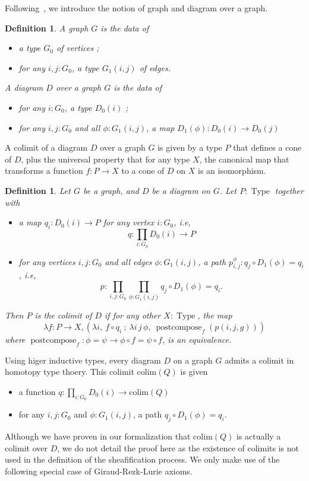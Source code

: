 \documentclass[conference]{IEEEtran}
\newtheorem{defi}[thm]{Definition}
\newcommand{\ie}{i.e,\xspace}
\DeclareMathOperator{\Type}{Type}
\DeclareMathOperator{\postcompose}{\mathrm{postcompose}}
\newcommand \colim[1] {\mathrm{colim}(Q)}
\begin{document}
Following~\cite{lumsdaine}, we introduce the notion of graph and
diagram over a graph.
%
\begin{defi}
  A {\em graph} $G$ is the data of
  \begin{itemize}
  \item a type $G_0$ of vertices ;
  \item for any $i,j:G_0$, a type $G_1(i,j)$ of edges.
  \end{itemize}

  A {\em diagram} $D$ over a graph $G$ is the data of
  \begin{itemize}
  \item for any $i:G_0$, a type $D_0(i)$ ;
  \item for any $i,j:G_0$ and all $\phi : G_1(i,j)$, a map $D_1(\phi)
    : D_0(i) \to D_0(j)$
  \end{itemize}
\end{defi}

A colimit of a diagram $D$ over a graph $G$ is given by a type $P$
that defines a cone of $D$, plus the universal property that for any
type $X$, the canonical map that transforms a function $f : P
\rightarrow X$ to a cone of $D$ on $X$ is an isomorphism.
% 
\begin{defi}
Let $G$ be a graph, and $D$ be a diagram on $G$. 
Let $P:\Type$ together with
\begin{itemize}
\item a map $q_i : D_0(i) \to P$ for any
vertex $i:G_0$, \ie $$q : \prod_{i:G_0} D_0(i) \to P$$
\item for any vertices $i,j:G_0$ and all edges $\phi:G_1(i,j)$, a path
  $p_{i,j}^\phi : q_j \circ D_1(\phi) = q_i$, \ie
  $$p : \prod_{i,j:G_0} \prod_{\phi:G_1(i,j)} q_j \circ D_1(\phi) = q_i.$$
\end{itemize}

Then $P$ is the {\em colimit} of $D$ if for any other $X:\Type$, the
map
$$\lambda f:P \to X, \left( \lambda i,~f \circ q_i~;~ \lambda i\, j\,
  \phi,~ \postcompose_f (p(i, j, g)) \right)$$
where $\postcompose_f : \phi = \psi \to \phi \circ f = \psi \circ f$,
is an equivalence.
\end{defi}


Using higer inductive types, every diagram $D$ on a graph $G$ admits a
colimit in homotopy type thoery. This colimit $\colim D$ is given
%
\begin{itemize}
\item a function $q:\prod_{i:G_0} D_0(i) \to \colim D$
\item for any $i,j:G_0$ and $\phi:G_1(i,j)$, a path
  $q_j \circ D_1(\phi) = q_i$.
\end{itemize}
%
Although we have proven in our formalization that $\colim D$ is
actually a colimit over $D$, we do not detail the proof here as the
existence of colimits is not used in the definition of the
sheafification process. We only make use of the following special case
of Giraud-Rezk-Lurie axioms.
\end{document}
